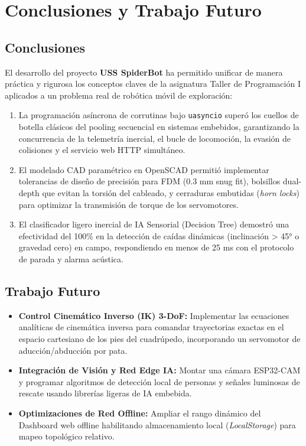 \documentclass[12pt]{article}
\newcommand{\codigo}[1]{\texttt{#1}}
\begin{document}
\newpage
\section{Conclusiones y Trabajo Futuro}

\subsection{Conclusiones}
El desarrollo del proyecto \textbf{USS SpiderBot} ha permitido unificar de manera práctica y rigurosa los conceptos claves de la asignatura Taller de Programación I aplicados a un problema real de robótica móvil de exploración:
\begin{enumerate}
    \item La programación asíncrona de corrutinas bajo \codigo{uasyncio} superó los cuellos de botella clásicos del pooling secuencial en sistemas embebidos, garantizando la concurrencia de la telemetría inercial, el bucle de locomoción, la evasión de colisiones y el servicio web HTTP simultáneo.
    \item El modelado CAD paramétrico en OpenSCAD permitió implementar tolerancias de diseño de precisión para FDM ($0.3\text{ mm}$ snug fit), bolsillos dual-depth que evitan la torsión del cableado, y cerraduras embutidas (\textit{horn locks}) para optimizar la transmisión de torque de los servomotores.
    \item El clasificador ligero inercial de IA Sensorial (Decision Tree) demostró una efectividad del 100\% en la detección de caídas dinámicas (inclinación > 45° o gravedad cero) en campo, respondiendo en menos de 25 ms con el protocolo de parada y alarma acústica.
\end{enumerate}

\subsection{Trabajo Futuro}
\begin{itemize}
    \item \textbf{Control Cinemático Inverso (IK) 3-DoF:} Implementar las ecuaciones analíticas de cinemática inversa para comandar trayectorias exactas en el espacio cartesiano de los pies del cuadrúpedo, incorporando un servomotor de aducción/abducción por pata.
    \item \textbf{Integración de Visión y Red Edge IA:} Montar una cámara ESP32-CAM y programar algoritmos de detección local de personas y señales luminosas de rescate usando librerías ligeras de IA embebida.
    \item \textbf{Optimizaciones de Red Offline:} Ampliar el rango dinámico del Dashboard web offline habilitando almacenamiento local (\textit{LocalStorage}) para mapeo topológico relativo.
\end{itemize}
\end{document}
